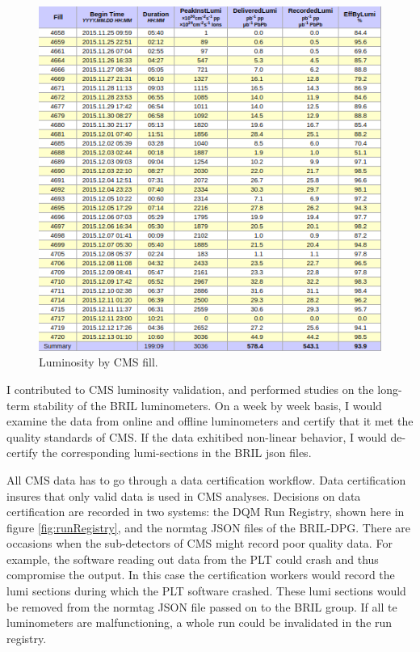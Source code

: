 \begin{figure}[h!]
\begin{centering}
\includegraphics[width=5.5in]{Chapter4/importfigs/lumiFill.png}
\par\end{centering}
\caption{Luminosity by CMS fill. \label{fig:lumiFill}}
\end{figure}

I contributed to CMS luminosity validation, and performed studies on the long-term stability of the BRIL luminometers. On a week by week basis, I would examine the data from online and offline luminometers and certify that it met the quality standards of CMS. If the data exhitibed non-linear behavior, I would de-certify the corresponding lumi-sections in the BRIL json files.

All CMS data has to go through a data certification workflow. Data certification insures that only valid data is used in CMS analyses. Decisions on data certification are recorded in two systems: the DQM Run Registry, shown here in figure \ref{fig:runRegistry}, and the normtag JSON files of the BRIL-DPG. There are occasions when the sub-detectors of CMS might record poor quality data. For example, the software reading out data from the PLT could crash and thus compromise the output. In this case the certification workers would record the lumi sections during which the PLT software crashed. These lumi sections would be removed from the normtag JSON file passed on to the BRIL group. If all te luminometers are malfunctioning, a whole run could be invalidated in the run registry.

